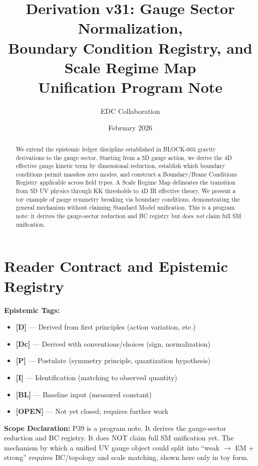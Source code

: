 \documentclass[11pt,a4paper]{article}
\title{Derivation v31: Gauge Sector Normalization,\\
Boundary Condition Registry, and Scale Regime Map\\[0.5em]
\large Unification Program Note}
\author{EDC Collaboration}
\date{February 2026}
\begin{document}
\maketitle

\begin{abstract}
We extend the epistemic ledger discipline established in BLOCK-003 gravity derivations
to the gauge sector. Starting from a 5D gauge action, we derive the 4D effective gauge
kinetic term by dimensional reduction, establish which boundary conditions permit
massless zero modes, and construct a Boundary/Brane Conditions Registry applicable
across field types. A Scale Regime Map delineates the transition from 5D UV physics
through KK thresholds to 4D IR effective theory. We present a toy example of gauge
symmetry breaking via boundary conditions, demonstrating the general mechanism without
claiming Standard Model unification. This is a program note: it derives the gauge-sector
reduction and BC registry but does \emph{not} claim full SM unification.
\end{abstract}

\tableofcontents
\newpage

\section{Reader Contract and Epistemic Registry}
\label{sec:contract}

\begin{readercontract}
\textbf{Epistemic Tags:}
\begin{itemize}
  \item \textbf{[D]} — Derived from first principles (action variation, etc.)
  \item \textbf{[Dc]} — Derived with conventions/choices (sign, normalization)
  \item \textbf{[P]} — Postulate (symmetry principle, quantization hypothesis)
  \item \textbf{[I]} — Identification (matching to observed quantity)
  \item \textbf{[BL]} — Baseline input (measured constant)
  \item \textbf{[OPEN]} — Not yet closed; requires further work
\end{itemize}

\textbf{Scope Declaration:} P39 is a program note. It derives the gauge-sector
reduction and BC registry. It does NOT claim full SM unification yet. The mechanism
by which a unified UV gauge object could split into ``weak $\to$ EM + strong''
requires BC/topology and scale matching, shown here only in toy form.
\end{readercontract}
\end{document}
